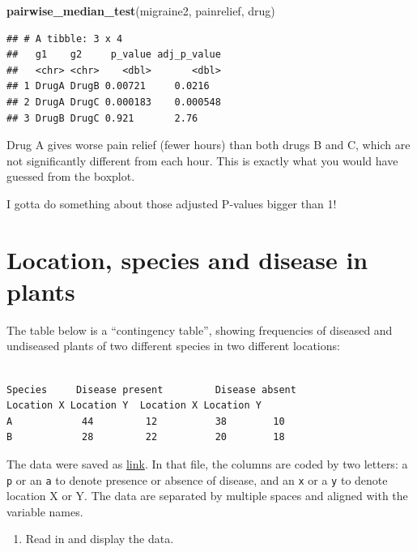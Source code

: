\documentclass[]{tufte-book}
\newenvironment{Shaded}{}{}
\newcommand{\KeywordTok}[1]{\textcolor[rgb]{0.00,0.44,0.13}{\textbf{#1}}}
\newcommand{\NormalTok}[1]{#1}
\providecommand{\tightlist}{%
  \setlength{\itemsep}{0pt}\setlength{\parskip}{0pt}}
\theoremstyle{definition}
\theoremstyle{definition}
\theoremstyle{definition}
\theoremstyle{remark}
\begin{document}
\begin{Shaded}
\begin{Highlighting}[]
\KeywordTok{pairwise_median_test}\NormalTok{(migraine2, painrelief, drug)}
\end{Highlighting}
\end{Shaded}

\begin{verbatim}
## # A tibble: 3 x 4
##   g1    g2     p_value adj_p_value
##   <chr> <chr>    <dbl>       <dbl>
## 1 DrugA DrugB 0.00721     0.0216  
## 2 DrugA DrugC 0.000183    0.000548
## 3 DrugB DrugC 0.921       2.76
\end{verbatim}

Drug A gives worse pain relief (fewer hours) than both drugs B and C,
which are not significantly different from each hour. This is exactly
what you would have guessed from the boxplot.

I gotta do something about those adjusted P-values bigger than 1!

\hypertarget{location-species-and-disease-in-plants}{%
\section{Location, species and disease in
plants}\label{location-species-and-disease-in-plants}}

The table below is a ``contingency table'', showing frequencies of
diseased and undiseased plants of two different species in two different
locations:

\begin{verbatim}

Species     Disease present         Disease absent
Location X Location Y  Location X Location Y
A            44         12          38        10
B            28         22          20        18
\end{verbatim}

The data were saved as
\href{http://www.utsc.utoronto.ca/~butler/c32/disease.txt}{link}. In
that file, the columns are coded by two letters: a \texttt{p} or an
\texttt{a} to denote presence or absence of disease, and an \texttt{x}
or a \texttt{y} to denote location X or Y. The data are separated by
multiple spaces and aligned with the variable names.

\begin{enumerate}
\def\labelenumi{(\alph{enumi})}
\tightlist
\item
  Read in and display the data.
\end{enumerate}
\end{document}
